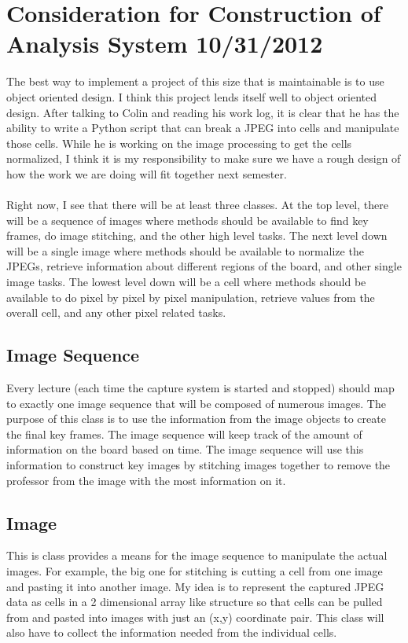 \documentclass[]{article}
\begin{document}
	\section{Consideration for Construction of Analysis System 10/31/2012}
		The best way to implement a project of this size that is maintainable is to use object oriented design. I think this project lends itself well to object oriented design. After talking to Colin and reading his work log, it is clear that he has the ability to write a Python script that can break a JPEG into cells and manipulate those cells. While he is working on the image processing to get the cells normalized, I think it is my responsibility to make sure we have a rough design of how the work we are doing will fit together next semester. \\
		\\
		Right now, I see that there will be at least three classes. At the top level, there will be a sequence of images where methods should be available to find key frames, do image stitching, and the other high level tasks. The next level down will be a single image where methods should be available to normalize the JPEGs, retrieve information about different regions of the board, and other single image tasks. The lowest level down will be a cell where methods should be available to do pixel by pixel by pixel manipulation, retrieve values from the overall cell, and any other pixel related tasks. 
		
		 \subsection{Image Sequence}
			Every lecture (each time the capture system is started and stopped) should map to exactly one image sequence that will be composed of numerous images. The purpose of this class is to use the information from the image objects to create the final key frames. The image sequence will keep track of the amount of information on the board based on time. The image sequence will use this information to construct key images by stitching images together to remove the professor from the image with the most information on it. 
			
		\subsection{Image}
			This is class provides a means for the image sequence to manipulate the actual images. For example, the big one for stitching is cutting a cell from one image and pasting it into another image. My idea is to represent the captured JPEG data as cells in a 2 dimensional array like structure so that cells can be pulled from and pasted into images with just an (x,y) coordinate pair. This class will also have to collect the information needed from the individual cells.
			
\end{document}
